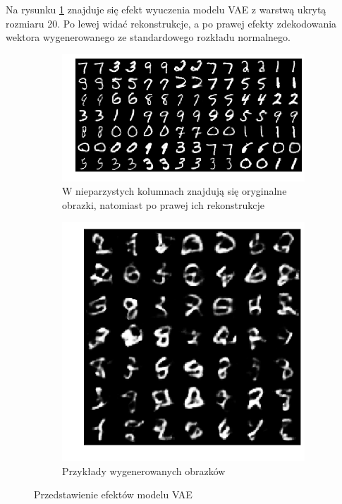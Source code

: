 Na rysunku \ref{fig:vae} znajduje się efekt wyuczenia modelu VAE z warstwą ukrytą rozmiaru 20. Po lewej widać rekonstrukcje, a po prawej efekty zdekodowania wektora wygenerowanego ze standardowego rozkładu normalnego.

\begin{figure}[h!]
  \centering
  \begin{subfigure}[b]{0.57\linewidth}
    \includegraphics[width=\linewidth]{images/mnist_recon}
    \caption{W nieparzystych kolumnach znajdują się oryginalne obrazki, natomiast po prawej ich rekonstrukcje}
  \end{subfigure}
  \begin{subfigure}[b]{0.30\linewidth}
    \includegraphics[width=\linewidth]{images/mnist_gen}
    \caption{Przykłady wygenerowanych obrazków}
  \end{subfigure}
  \caption{Przedstawienie efektów modelu VAE}
  \label{fig:vae}
\end{figure}

